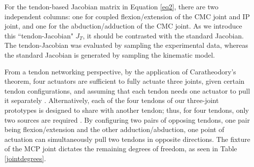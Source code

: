 \documentclass[journal]{IEEEtran}
\begin{document}
For the tendon-based Jacobian matrix in Equation \ref{eq2}, there are two independent columns: one for coupled flexion/extension of the CMC joint and IP joint, and one for the abduction/adduction of the CMC joint. As we introduce this ``tendon-Jacobian" $J_{T}$, it should be contrasted with the standard Jacobian. The tendon-Jacobian was evaluated by sampling the experimental data, whereas the standard Jacobian is generated by sampling the kinematic model. %

From a tendon networking perspective, by the application of Caratheodory's theorem, four actuators are sufficient to fully actuate three joints, given certain tendon configurations, and assuming that each tendon needs one actuator to pull it separately \cite{MLS}. Alternatively, each of the four tendons of our three-joint prototypes is designed to share with another tendon; thus, for four tendons, only two sources are required \cite{malhotra}. By configuring two pairs of opposing tendons, one pair being flexion/extension and the other adduction/abduction, one point of actuation can simultaneously pull two tendons in opposite directions. The fixture of the MCP joint dictates the remaining degrees of freedom, as seen in Table \ref{jointdegrees}. 


\end{document}
